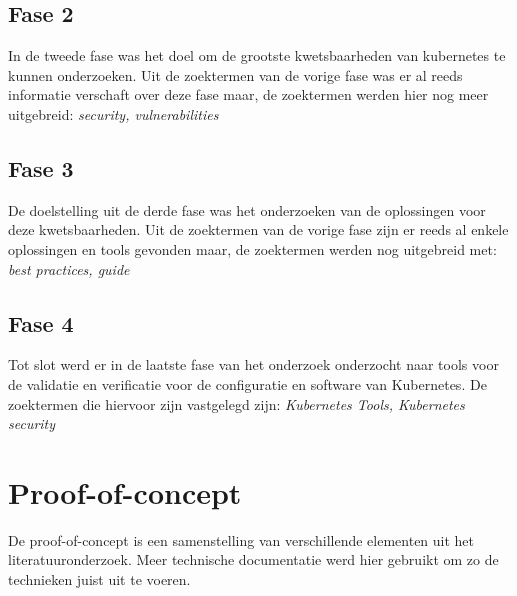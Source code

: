 \subsection{Fase 2}
In de tweede fase was het doel om de grootste kwetsbaarheden van kubernetes te kunnen onderzoeken. 
Uit de zoektermen van de vorige fase was er al reeds informatie verschaft over deze fase maar, de zoektermen werden hier nog meer uitgebreid: \textit{security, vulnerabilities}

\subsection{Fase 3}
De doelstelling uit de derde fase was het onderzoeken van de oplossingen voor deze kwetsbaarheden. 
Uit de zoektermen van de vorige fase zijn er reeds al enkele oplossingen en tools gevonden maar, de zoektermen werden nog uitgebreid met: \textit{best practices, guide}

\subsection{Fase 4}
Tot slot werd er in de laatste fase van het onderzoek onderzocht naar tools voor de validatie en verificatie voor de configuratie en software van Kubernetes. 
De zoektermen die hiervoor zijn vastgelegd zijn: \textit{Kubernetes Tools, Kubernetes security}


\section{Proof-of-concept}
De proof-of-concept is een samenstelling van verschillende elementen uit het literatuuronderzoek. Meer technische documentatie werd hier gebruikt om zo de technieken juist uit te voeren. 

